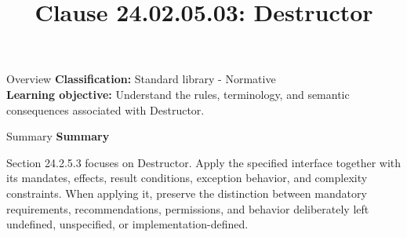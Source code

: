 \documentclass[10pt,letterpaper]{article}
\title{Clause 24.02.05.03: Destructor}
\author{}
\date{}
\begin{document}
\maketitle
\begin{CornellOverviewBox}{Overview}
\textbf{Classification:} Standard library - Normative\\[2pt]
\textbf{Learning objective:} Understand the rules, terminology, and semantic consequences associated with Destructor.
\end{CornellOverviewBox}\begin{CornellSummaryBox}{Summary}
{\sffamily\bfseries\color{Accent} Summary}\par\vspace{3pt}Section 24.2.5.3 focuses on Destructor. Apply the specified interface together with its mandates, effects, result conditions, exception behavior, and complexity constraints. When applying it, preserve the distinction between mandatory requirements, recommendations, permissions, and behavior deliberately left undefined, unspecified, or implementation-defined.
\end{CornellSummaryBox}
\end{document}
